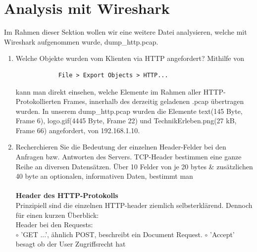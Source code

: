 \documentclass[11pt]{article}
\begin{document}
    \section{Analysis mit Wireshark}
    Im Rahmen dieser Sektion wollen wir eine weitere Datei analysieren, welche mit Wireshark aufgenommen wurde, dump\_http.pcap.
    \begin{enumerate}[\thesection .1]
        \item Welche Objekte wurden vom Klienten via HTTP angefordert?
        Mithilfe von
        \begin{verbatim}
            File > Export Objects > HTTP...
        \end{verbatim}
        kann man direkt einsehen, welche Elemente im Rahmen aller HTTP-Protokollierten Frames, innerhalb des derzeitig geladenen .pcap übertragen wurden.
        In unserem dump\_http.pcap wurden die Elemente text(145 Byte, Frame 6), logo.gif(4445 Byte, Frame 22) und TechnikErleben.png(27 kB, Frame 66) angefordert, von 192.168.1.10.

        \item Recherchieren Sie die Bedeutung der einzelnen Header-Felder bei den Anfragen bzw. Antworten des Servers.
        TCP-Header bestimmen eine ganze Reihe an diversen Datensätzen. Über 10 Felder von je 20 bytes \& zusätzlichen 40 byte
        an optionalen, informativen Daten, bestimmt man\\\\

        \textbf{Header des HTTP-Protokolls}\\
        Prinzipiell sind die einzelnen HTTP-header ziemlich selbsterklärend. Dennoch für einen kurzen Überblick:\\
        Header bei den Requests:\\
        $\circ$ 'GET ...', ähnlich POST, beschreibt ein Document Request.
        $\circ$ 'Accept' besagt ob der User Zugriffsrecht hat


\end{enumerate}
\end{document}
